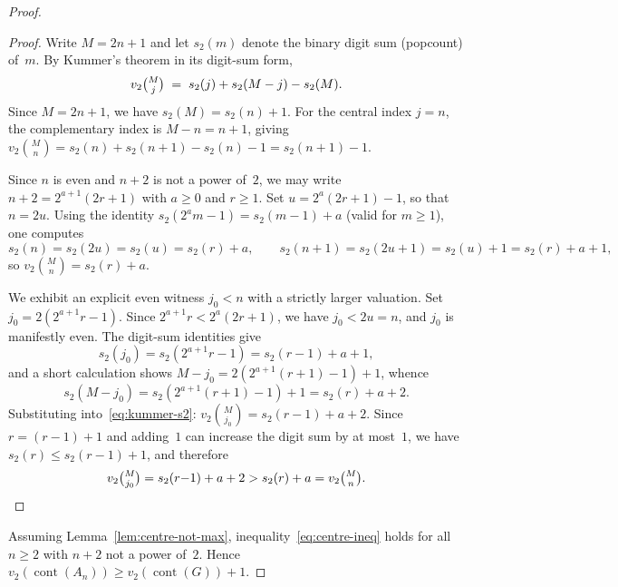 \documentclass[10pt]{amsart}
\theoremstyle{definition}
\theoremstyle{remark}
\DeclareMathOperator{\cont}{cont}
\begin{document}
\begin{proof}
\begin{proof}
Write $M = 2n{+}1$ and let $s_2(m)$ denote the binary digit sum (popcount) of~$m$.
By Kummer's theorem in its digit-sum form,
\begin{equation}\label{eq:kummer-s2}
v_2\tbinom{M}{j} \;=\; s_2(j) + s_2(M - j) - s_2(M).
\end{equation}
Since $M = 2n{+}1$, we have $s_2(M) = s_2(n) + 1$.
For the central index $j = n$, the complementary index is $M - n = n{+}1$, giving
$v_2\binom{M}{n} = s_2(n) + s_2(n{+}1) - s_2(n) - 1 = s_2(n{+}1) - 1$.

Since $n$ is even and $n{+}2$ is not a power of~$2$, we may write
$n + 2 = 2^{a+1}(2r+1)$ with $a \ge 0$ and $r \ge 1$.
Set $u = 2^a(2r{+}1) - 1$, so that $n = 2u$.
Using the identity $s_2(2^a m - 1) = s_2(m{-}1) + a$ (valid for $m \ge 1$),
one computes
\[
s_2(n) = s_2(2u) = s_2(u) = s_2(r) + a, \qquad
s_2(n{+}1) = s_2(2u{+}1) = s_2(u) + 1 = s_2(r) + a + 1,
\]
so $v_2\binom{M}{n} = s_2(r) + a$.

We exhibit an explicit even witness $j_0 < n$ with a strictly larger valuation.
Set $j_0 = 2(2^{a+1}r - 1)$.
Since $2^{a+1}r < 2^a(2r{+}1)$, we have $j_0 < 2u = n$, and $j_0$ is
manifestly even.  The digit-sum identities give
\[
s_2(j_0) = s_2(2^{a+1}r - 1) = s_2(r{-}1) + a + 1,
\]
and a short calculation shows $M - j_0 = 2(2^{a+1}(r{+}1) - 1) + 1$, whence
\[
s_2(M - j_0) = s_2(2^{a+1}(r{+}1) - 1) + 1 = s_2(r) + a + 2.
\]
Substituting into~\eqref{eq:kummer-s2}:
$v_2\binom{M}{j_0} = s_2(r{-}1) + a + 2$.
Since $r = (r{-}1) + 1$ and adding~$1$ can increase the digit sum by at most~$1$,
we have $s_2(r) \le s_2(r{-}1) + 1$, and therefore
\[
v_2\tbinom{M}{j_0} = s_2(r{-}1) + a + 2 > s_2(r) + a = v_2\tbinom{M}{n}. \qedhere
\]
\end{proof}

\noindent
Assuming Lemma~\ref{lem:centre-not-max},
inequality~\eqref{eq:centre-ineq} holds for all
$n \ge 2$ with $n+2$ not a power of~$2$.
Hence $v_2(\cont(A_n)) \ge v_2(\cont(G))+1$.


\end{proof}
\end{document}
